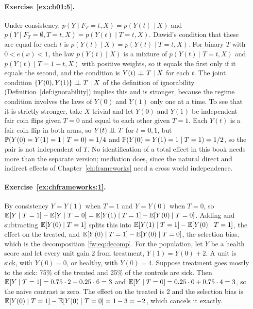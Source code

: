 \paragraph{Exercise~\ref{ex:ch01:5}.} Under consistency, $p(Y \mid F_T = t, X) = p(Y(t) \mid X)$ and $p(Y \mid F_T = \emptyset, T = t, X) = p(Y(t) \mid T = t, X)$. Dawid's condition that these are equal for each $t$ is $p(Y(t) \mid X) = p(Y(t) \mid T = t, X)$. For binary $T$ with $0 < e(x) < 1$, the law $p(Y(t) \mid X)$ is a mixture of $p(Y(t) \mid T = t, X)$ and $p(Y(t) \mid T = 1 - t, X)$ with positive weights, so it equals the first only if it equals the second, and the condition is $Y(t) \perp\!\!\!\perp T \mid X$ for each $t$. The joint condition $\{Y(0), Y(1)\} \perp\!\!\!\perp T \mid X$ of the definition of ignorability (Definition~\ref{def:ignorability}) implies this and is stronger, because the regime condition involves the laws of $Y(0)$ and $Y(1)$ only one at a time. To see that it is strictly stronger, take $X$ trivial and let $Y(0)$ and $Y(1)$ be independent fair coin flips given $T = 0$ and equal to each other given $T = 1$. Each $Y(t)$ is a fair coin flip in both arms, so $Y(t) \perp\!\!\!\perp T$ for $t = 0, 1$, but $\mathbb{P}(Y(0) = Y(1) = 1 \mid T = 0) = 1/4$ and $\mathbb{P}(Y(0) = Y(1) = 1 \mid T = 1) = 1/2$, so the pair is not independent of $T$. No identification of a total effect in this book needs more than the separate version; mediation does, since the natural direct and indirect effects of Chapter~\ref{ch:frameworks} need a cross world independence.

\paragraph{Exercise~\ref{ex:chframeworks:1}.} By consistency $Y = Y(1)$ when $T = 1$ and $Y = Y(0)$ when $T = 0$, so $\mathbb{E}[Y \mid T=1] - \mathbb{E}[Y \mid T=0] = \mathbb{E}[Y(1) \mid T=1] - \mathbb{E}[Y(0) \mid T=0]$. Adding and subtracting $\mathbb{E}[Y(0) \mid T=1]$ splits this into $\mathbb{E}[Y(1) \mid T=1] - \mathbb{E}[Y(0) \mid T=1]$, the effect on the treated, and $\mathbb{E}[Y(0) \mid T=1] - \mathbb{E}[Y(0) \mid T=0]$, the selection bias, which is the decomposition \eqref{fw:eq:decomp}. For the population, let $Y$ be a health score and let every unit gain 2 from treatment, $Y(1) = Y(0) + 2$. A unit is sick, with $Y(0) = 0$, or healthy, with $Y(0) = 4$. Suppose treatment goes mostly to the sick: 75\% of the treated and 25\% of the controls are sick. Then $\mathbb{E}[Y \mid T=1] = 0.75 \cdot 2 + 0.25 \cdot 6 = 3$ and $\mathbb{E}[Y \mid T=0] = 0.25 \cdot 0 + 0.75 \cdot 4 = 3$, so the naive contrast is zero. The effect on the treated is 2 and the selection bias is $\mathbb{E}[Y(0) \mid T=1] - \mathbb{E}[Y(0) \mid T=0] = 1 - 3 = -2$, which cancels it exactly.

